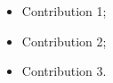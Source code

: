 \begin{itemize}
  \item  Contribution 1;
  \item  Contribution 2;
  \item  Contribution 3.
\end{itemize}